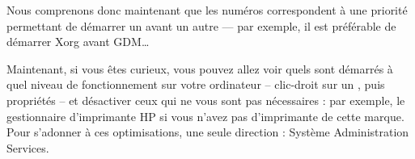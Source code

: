 Nous comprenons donc maintenant que les numéros correspondent à une priorité permettant de démarrer un  avant un autre --- par exemple, il est préférable de démarrer Xorg avant GDM\ldots{}\par
Maintenant, si vous êtes curieux, vous pouvez allez voir quels  sont démarrés à quel niveau de fonctionnement sur votre ordinateur -- clic-droit sur un , puis propriétés -- et désactiver ceux qui ne vous sont pas nécessaires : par exemple, le gestionnaire d'imprimante HP si vous n'avez pas d'imprimante de cette marque. Pour s'adonner à ces optimisations, une seule direction : Système \FlecheDroite Administration \FlecheDroite Services.

